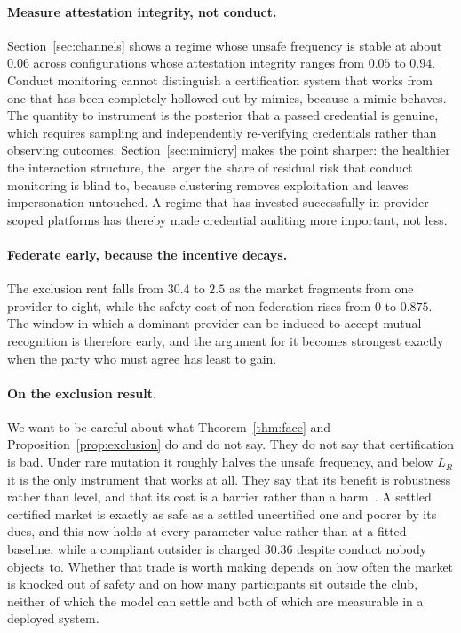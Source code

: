 \documentclass[11pt,a4paper]{article}
\theoremstyle{definition}
\begin{document}
\paragraph{Measure attestation integrity, not conduct.} Section~\ref{sec:channels}
shows a regime whose unsafe frequency is stable at about $0.06$ across
configurations whose attestation integrity ranges from $0.05$ to $0.94$.
Conduct monitoring cannot distinguish a certification system that works from
one that has been completely hollowed out by mimics, because a mimic
behaves.
The quantity to instrument is the posterior that a passed credential is
genuine, which requires sampling and independently re-verifying credentials
rather than observing outcomes. Section~\ref{sec:mimicry} makes the point
sharper: the healthier the interaction structure, the larger the share of
residual risk that conduct monitoring is blind to, because clustering removes
exploitation and leaves impersonation untouched. A regime that has invested
successfully in provider-scoped platforms has thereby made credential auditing
more important, not less.

\paragraph{Federate early, because the incentive decays.} The exclusion rent
falls from $30.4$ to $2.5$ as the market fragments from one provider to eight,
while the safety cost of non-federation rises from $0$ to $0.875$. The window
in which a dominant provider can be induced to accept mutual recognition is
therefore early, and the argument for it becomes strongest exactly when the
party who must agree has least to gain.

\paragraph{On the exclusion result.} We want to be careful about what
Theorem~\ref{thm:face} and Proposition~\ref{prop:exclusion} do and do not
say. They do not say that certification is bad. Under rare mutation it roughly
halves
the unsafe frequency, and below $L_R$ it is the only instrument that works at
all. They say that its benefit is robustness rather than level, and that its
cost is a barrier rather than a harm~\citep{leland1979quacks}. A settled certified
market is exactly as safe as a settled uncertified one and poorer by its dues,
and this now holds at every parameter value rather than at a fitted baseline,
while a compliant outsider is charged $30.36$ despite conduct nobody objects
to. Whether that trade
is worth making depends on how often the market is knocked out of safety and
on how many participants sit outside the club, neither of which the model can
settle and both of which are measurable in a deployed system.
\end{document}
